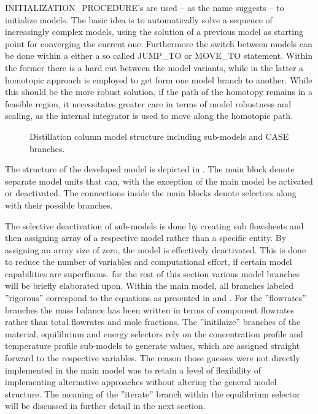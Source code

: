     INITIALIZATION\_PROCEDURE's are used -- as the name suggests -- to initialize models. The basic idea is to automatically
    solve a sequence of increasingly complex models, using the solution of a previous model as starting point for
    converging the current one. Furthermore the switch between models can be done within a either a so called JUMP\_TO
    or MOVE\_TO statement. Within the former there is a hard cut between the model variants, while in the latter
    a homotopic approach is employed to get form one model branch to another. While this should be the more robust
    solution, if the path of the homotopy remains in a feasible region, it necessitates greater care in terms of model
    robustness and scaling, as the internal integrator is used to move along the homotopic path.

    \begin{landscape}
        \begin{figure}
            \center
            
            \caption{Distillation column model structure including sub-models and CASE branches.}
            \label{fig:mathpro:modelstruct}
        \end{figure}
    \end{landscape}

    The structure of the developed model is depicted in . The main block denote separate model
    units that can, with the exception of the main model be activated or deactivated. The connections inside the main blocks
    denote selectors along with their possible branches.

    The selective deactivation of sub-models is done by creating sub flowsheets and then assigning array of a respective model
    rather than a specific entity. By assigning an array size of zero, the model is effectively deactivated. This is done to reduce
    the number of variables and computational effort, if certain model capabilities are superfluous. for the rest of this section
    various model branches will be briefly elaborated upon. Within the main model, all branches labeled ''rigorous'' correspond
    to the equations as presented in  and . For the ''flowrates''
    branches the mass balance has been written in terms of component flowrates rather than total flowrates and mole fractions.
    The ''initilaize'' branches of the material, equilibrium and energy selectors rely on the concentration profile and temperature
    profile sub-models to generate values, which are assigned straight forward to the respective variables. The reason those guesses
    were not directly implemented in the main model was to retain a level of flexibility of implementing alternative approaches
    without altering the general model structure. The meaning of the ''iterate'' branch within the equilibrium selector
    will be discussed in further detail in the next section.

